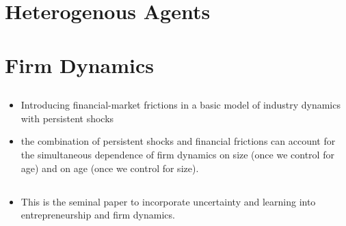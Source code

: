 \documentclass[10pt]{article} %
\begin{document}
\section{Heterogenous Agents}
    \subsection{\cite{Aiyagari1994}}

    \subsection{\cite{KrusellSmith1998}}

\section{Firm Dynamics}
    \subsection{\cite{Hopenhayn1992}}
    \subsection{\cite{Kochen2023}}

    \subsection{\cite{ArellanoBaiZhang2012}}

    \subsection{\cite{CooleyQuadrini2001}}
    \begin{itemize}
        \item Introducing financial-market frictions in a basic model of industry dynamics with persistent shocks
        \item the combination of persistent shocks and financial frictions can account for the simultaneous dependence of firm dynamics on size (once we control for age) and on age (once we control for size).
    \end{itemize}

    \subsection{\cite{Jovanovic1982}}
    \begin{itemize}
        \item This is the seminal paper to incorporate uncertainty and learning into entrepreneurship and firm dynamics.
    \end{itemize}
\end{document}
